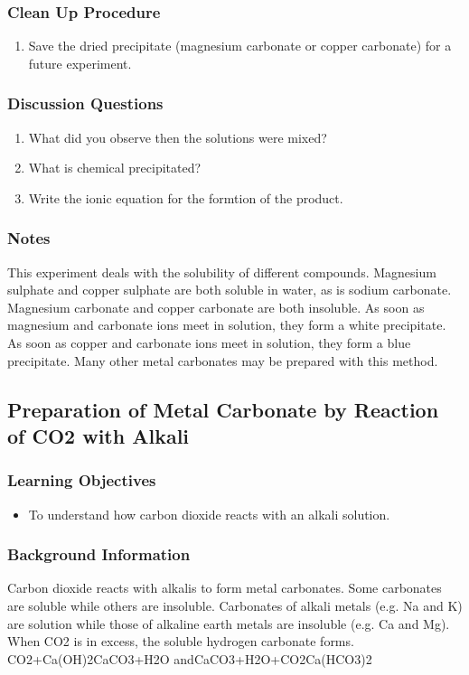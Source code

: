 \subsubsection*{Clean Up Procedure}
\begin{enumerate}
\item{Save the dried precipitate (magnesium carbonate or copper carbonate) for a future experiment.}
\end{enumerate}

\subsubsection*{Discussion Questions}
\begin{enumerate}
\item{What did you observe then the solutions were mixed?}
\item{What is chemical precipitated?}
\item{Write the ionic equation for the formtion of the product.}
\end{enumerate}

\subsubsection*{Notes}
This experiment deals with the solubility of different compounds. Magnesium sulphate and copper sulphate are both soluble in water, as is sodium carbonate. Magnesium carbonate and copper carbonate are both insoluble. As soon as magnesium and carbonate ions meet in solution, they form a white precipitate. As soon as copper and carbonate ions meet in solution, they form a blue precipitate. Many other metal carbonates may be prepared with this method.

\subsection{Preparation of Metal Carbonate by Reaction of CO2 with Alkali}

\subsubsection*{Learning Objectives}
\begin{itemize}
\item{To understand how carbon dioxide reacts with an alkali solution.}
\end{itemize}

\subsubsection*{Background Information}
Carbon dioxide reacts with alkalis to form metal carbonates. Some carbonates are soluble while others are insoluble. Carbonates of alkali metals (e.g. Na and K) are solution while those of alkaline earth metals are insoluble (e.g. Ca and Mg). When CO2 is in excess, the soluble hydrogen carbonate forms.
CO2+Ca(OH)2CaCO3+H2O
andCaCO3+H2O+CO2Ca(HCO3)2

